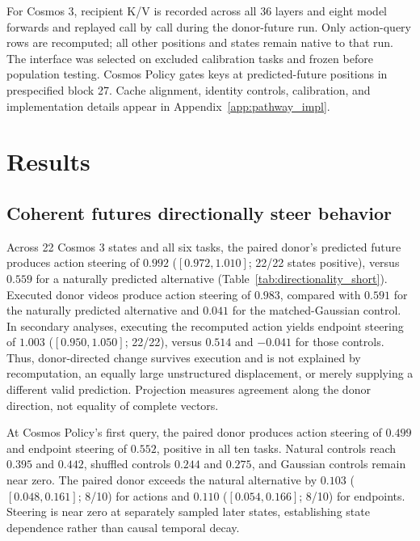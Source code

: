 For Cosmos 3, recipient K/V is recorded across all 36 layers and eight model forwards and replayed call by call during the donor-future run. Only action-query rows are recomputed; all other positions and states remain native to that run. The interface was selected on excluded calibration tasks and frozen before population testing. Cosmos Policy gates keys at predicted-future positions in prespecified block 27. Cache alignment, identity controls, calibration, and implementation details appear in Appendix~\ref{app:pathway_impl}.

\section{Results}
\label{sec:results}

\subsection{Coherent futures directionally steer behavior}
\label{sec:steering}

Across 22 Cosmos 3 states and all six tasks, the paired donor's predicted future produces action steering of $0.992$ ($[0.972,1.010]$; 22/22 states positive), versus $0.559$ for a naturally predicted alternative (Table~\ref{tab:directionality_short}). Executed donor videos produce action steering of $0.983$, compared with $0.591$ for the naturally predicted alternative and $0.041$ for the matched-Gaussian control. In secondary analyses, executing the recomputed action yields endpoint steering of $1.003$ ($[0.950,1.050]$; 22/22), versus $0.514$ and $-0.041$ for those controls. Thus, donor-directed change survives execution and is not explained by recomputation, an equally large unstructured displacement, or merely supplying a different valid prediction. Projection measures agreement along the donor direction, not equality of complete vectors.

At Cosmos Policy's first query, the paired donor produces action steering of $0.499$ and endpoint steering of $0.552$, positive in all ten tasks. Natural controls reach $0.395$ and $0.442$, shuffled controls $0.244$ and $0.275$, and Gaussian controls remain near zero. The paired donor exceeds the natural alternative by $0.103$ ($[0.048,0.161]$; 8/10) for actions and $0.110$ ($[0.054,0.166]$; 8/10) for endpoints. Steering is near zero at separately sampled later states, establishing state dependence rather than causal temporal decay.

